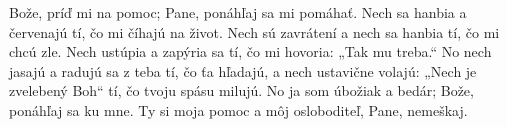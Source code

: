Bože, príď mi na pomoc;
Pane, ponáhľaj sa mi pomáhať.
\versseparator
Nech sa hanbia a červenajú tí,
čo mi číhajú na život.
\versseparator
Nech sú zavrátení a nech sa hanbia tí,
čo mi chcú zle.
\versseparator
Nech ustúpia a zapýria sa tí,
čo mi hovoria: „Tak mu treba.“
\versseparator
No nech jasajú a radujú sa z teba tí, čo ťa hľadajú,
a nech ustavične volajú: „Nech je zvelebený Boh“
tí, čo tvoju spásu milujú.
\versseparator
No ja som úbožiak a bedár;
Bože, ponáhľaj sa ku mne.
\versseparator
Ty si moja pomoc a môj osloboditeľ,
Pane, nemeškaj.